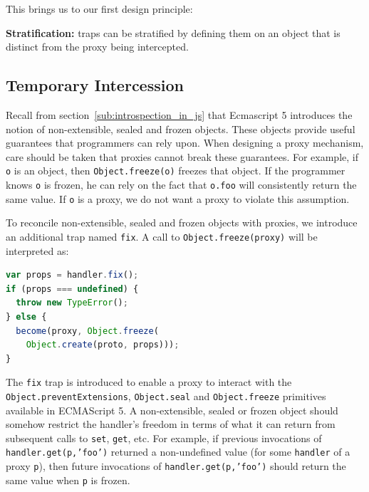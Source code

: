 \documentclass{acm_proc_article-sp}
\begin{document}
This brings us to our first design principle:

\textbf{Stratification:} traps can be stratified by defining them on an object that is distinct from the proxy being intercepted.

\subsection{Temporary Intercession}
\label{sub:immutability}

Recall from section~\ref{sub:introspection_in_js} that Ecmascript 5 introduces the notion of non-extensible, sealed and frozen objects. These objects provide useful guarantees that programmers can rely upon. When designing a proxy mechanism, care should be taken that proxies cannot break these guarantees. For example, if \texttt{o} is an object, then \texttt{Object.freeze(o)} freezes that object. If the programmer knows \texttt{o} is frozen, he can rely on the fact that \texttt{o.foo} will consistently return the same value. If \texttt{o} is a proxy, we do not want a proxy to violate this assumption.

To reconcile non-extensible, sealed and frozen objects with proxies, we introduce an additional trap named \texttt{fix}. A call to \texttt{Object.freeze(proxy)} will be interpreted as:

\begin{lstlisting}[language=javascript]
var props = handler.fix();
if (props === undefined) {
  throw new TypeError();
} else {
  become(proxy, Object.freeze(
    Object.create(proto, props)));
}
\end{lstlisting}

The \texttt{fix} trap is introduced to enable a proxy to interact with the \texttt{Object.preventExtensions}, \texttt{Object.seal} and \texttt{Object.freeze} primitives available in ECMAScript 5. A non-extensible, sealed or frozen object should somehow restrict the handler’s freedom in terms of what it can return from subsequent calls to \texttt{set}, \texttt{get}, etc. For example, if previous invocations of \texttt{handler.get(p,'foo')} returned a non-undefined value (for some \texttt{handler} of a proxy \texttt{p}), then future invocations of \texttt{handler.get(p,'foo')} should return the same value when \texttt{p} is frozen.
\end{document}
